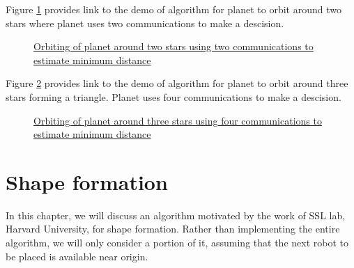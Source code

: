 \documentclass{report}[12pt]
\begin{document}
Figure \ref{fig:orbit_two_star} provides link to the demo of algorithm for planet to orbit around two stars where planet uses two communications to make a descision.
\begin{figure}[H]
    \centering
    \caption{\href{https://youtu.be/EKvty2OxXxM}{Orbiting of planet around two stars using two communications to estimate minimum distance}}
    \label{fig:orbit_two_star}
\end{figure}

Figure \ref{fig:orbit_three_stars} provides link to the demo of algorithm for planet to orbit around three stars forming a triangle. Planet uses four communications to make a descision.
\begin{figure}[H]
    \centering
    \caption{\href{https://youtu.be/5aZm0Os9BPc}{Orbiting of planet around three stars using four communications to estimate minimum distance}}
    \label{fig:orbit_three_stars}
\end{figure}

\chapter{Shape formation}
In this chapter, we will discuss an algorithm motivated by the work \cite{MR-AC-RN:2014} of SSL lab, Harvard University, for shape formation. Rather than implementing the entire algorithm, we will only consider a portion of it, assuming that the next robot to be placed is available near origin.
\end{document}
